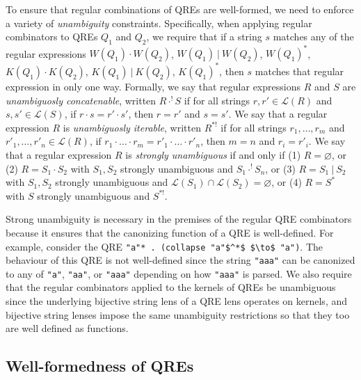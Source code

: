 \documentclass[acmsmall,review,anonymous]{acmart}
\newcommand{\sep}{\ensuremath{\ | \ }}
\newcommand{\cd}[1]{\lstinline[backgroundcolor=\color{white}]$#1$}
\begin{document}
To ensure that regular combinations of QREs are well-formed, we need
to enforce a variety of {\em unambiguity} constraints.  
Specifically, when applying regular combinators to QREs $Q_1$ and $Q_2$, we require that
if a string $s$ matches any of the regular expressions $W(Q_1) \cdot W(Q_2)$,
\quad $W(Q_1) \sep W(Q_2)$, \quad $W(Q_1)^*$, \quad $K(Q_1) \cdot K(Q_2)$,
\quad $K(Q_1) \sep K(Q_2)$, \quad $K(Q_1)^*$, then $s$ matches that regular
expression in only one way.
Formally, we say that regular expressions $R$ and $S$ are
\textit{unambiguosly concatenable}, written $R \cdot^! S$ if for all strings
$r, r' \in \mathcal{L}(R)$ and $s, s' \in \mathcal{L}(S)$, if $r \cdot s = r'
\cdot s'$, then $r = r'$ and $s = s'$. We say that a regular expression $R$ is
\textit{unambiguosly iterable}, written $R^{*!}$ if for all strings $r_1,
\ldots, r_m$ and $r'_1, \ldots, r'_n \in \mathcal{L}(R)$, if $r_1 \cdot \ldots
\cdot r_m = r'_1 \cdot \ldots \cdot r'_n$, then $m = n$ and $r_i = r'_i$. We say
that a regular expression $R$ is \textit{strongly unambiguous}\cite{Sippu1988}
if and only if (1) $R = \varnothing$, or (2) $R = S_1 \cdot S_2$ with $S_1,
S_2$ strongly unambiguous and $S_1 \cdot^! S_n$, or (3) $R = S_1 \sep S_2$ with
$S_1, S_2$ strongly unambiguous and $\mathcal{L}(S_1) \cap \mathcal{L}(S_2) =
\varnothing$, or (4) $R = S^*$ with $S$ strongly unambiguous and $S^{*!}$.

Strong unambiguity is necessary in the premises of the regular QRE combinators
because it ensures that the canonizing function of a QRE is well-defined.
For example, consider the QRE \lstinline{"a"* . (collapse "a"$^*$ $\to$ "a")}. The
behaviour of this QRE is not well-defined since the string
\cd{"aaa"} can be canonized to any of \cd{"a"}, \cd{"aa"}, or \cd{"aaa"}
depending on how \cd{"aaa"} is parsed. We also require that the regular
combinators applied to the kernels of QREs be unambiguous since the underlying
bijective string lens of a QRE lens operates on kernels, and bijective string lenses
impose the same unambiguity restrictions so that they too are well defined as
functions.

\subsection{Well-formedness of QREs}
\end{document}
